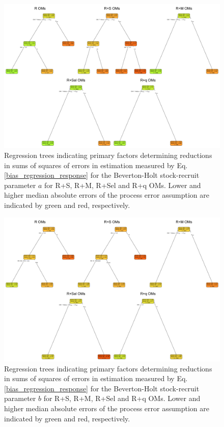 \documentclass[
  12pt,
]{article}
\begin{document}
\begin{landscape}
\begin{figure}
\begin{center}
\includegraphics{SR_a_bias_regtree_plots}
\end{center}
\caption{Regression trees indicating primary factors determining reductions in sums of squares of errors in estimation measured by Eq. \ref{bias_regression_response} for the Beverton-Holt stock-recruit parameter $a$ for R+S, R+M, R+Sel and R+q OMs. Lower and higher median absolute errors of the process error assumption are indicated by green and red, respectively.}\label{SR_a_bias_regtree}
\end{figure}
\end{landscape}

\begin{landscape}
\begin{figure}
\begin{center}
\includegraphics{SR_b_bias_regtree_plots}
\end{center}
\caption{Regression trees indicating primary factors determining reductions in sums of squares of errors in estimation measured by Eq. \ref{bias_regression_response} for the Beverton-Holt stock-recruit parameter $b$ for R+S, R+M, R+Sel and R+q OMs. Lower and higher median absolute errors of the process error assumption are indicated by green and red, respectively.}\label{SR_b_bias_regtree}
\end{figure}
\end{landscape}
\end{document}
